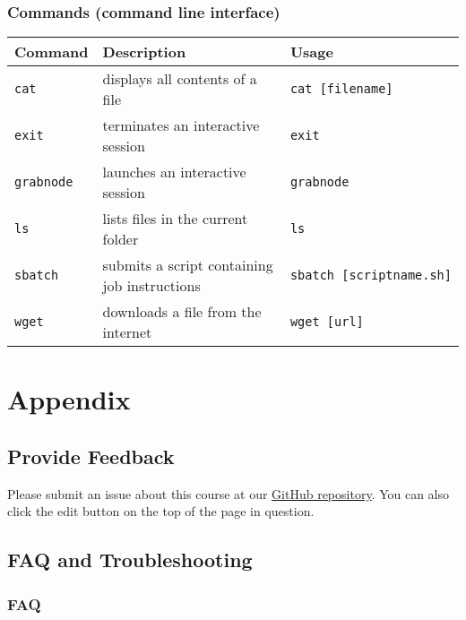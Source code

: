 \documentclass[
]{book}
\begin{document}
\hypertarget{commands-command-line-interface}{%
\section{Commands (command line interface)}\label{commands-command-line-interface}}

\begin{longtable}[]{@{}lll@{}}
\toprule
Command & Description & Usage \\
\midrule
\endhead
\texttt{cat} & displays all contents of a file & \texttt{cat\ {[}filename{]}} \\
\texttt{exit} & terminates an interactive session & \texttt{exit} \\
\texttt{grabnode} & launches an interactive session & \texttt{grabnode} \\
\texttt{ls} & lists files in the current folder & \texttt{ls} \\
\texttt{sbatch} & submits a script containing job instructions & \texttt{sbatch\ {[}scriptname.sh{]}} \\
\texttt{wget} & downloads a file from the internet & \texttt{wget\ {[}url{]}} \\
\bottomrule
\end{longtable}

\hypertarget{part-appendix}{%
\part*{Appendix}\label{part-appendix}}

\hypertarget{feedback}{%
\chapter{Provide Feedback}\label{feedback}}

Please submit an issue about this course at our \href{https://github.com/fhdsl/FH_Cluster_Guide/issues/new}{GitHub repository}. You can also click the edit button on the top of the page in question.

\hypertarget{faq-and-troubleshooting}{%
\chapter{FAQ and Troubleshooting}\label{faq-and-troubleshooting}}

\hypertarget{faq}{%
\section{FAQ}\label{faq}}
\end{document}
